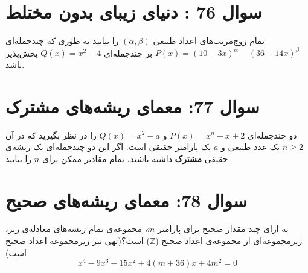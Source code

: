 \documentclass[12pt]{article}
\begin{document}
	
	
	\vspace{1cm}
	\hrulefill
	\vspace{1cm}
	
	\section*{سوال 76 : دنیای زیبای بدون مختلط}
	تمام زوج‌مرتب‌های اعداد طبیعی \((\alpha, \beta)\) را بیابید به طوری که چندجمله‌ای \newline\(P(x) = (10 - 3x)^{\alpha} - (36 - 14x)^{\beta}\) بر چندجمله‌ای \(Q(x) = x^2 - 4\) بخش‌پذیر باشد.
	
	\vspace{1cm}
	\hrulefill
	\vspace{1cm}
	\section*{سوال 77: معمای ریشه‌های مشترک}
	دو چندجمله‌ای \(P(x) = x^n - x + 2\) و \(Q(x) = x^2 - a\) را در نظر بگیرید که در آن \(n \ge 2\) یک عدد طبیعی و \(a\) یک پارامتر حقیقی است. اگر این دو چندجمله‌ای یک ریشه‌ی حقیقی \textbf{مشترک} داشته باشند، تمام مقادیر ممکن برای \(n\) را بیابید.
	
	
	\vspace{1cm}
	\hrulefill
	\vspace{1cm}
	
\section*{سوال 78: معمای ریشه‌های صحیح}
به ازای چند مقدار صحیح برای پارامتر \(m\)، مجموعه‌ی تمام ریشه‌های معادله‌ی زیر، زیرمجموعه‌ای از مجموعه‌ی اعداد صحیح (\(\mathbb{Z}\)) است؟(تهی نیز زیرمجموعه اعداد صحیح است)
\begin{displaymath}
	x^4 - 9x^3 - 15x^2 + 4(m+36)x + 4m^2 = 0
\end{displaymath}


\vspace{1cm}
\hrulefill
\vspace{1cm}

\end{document}
